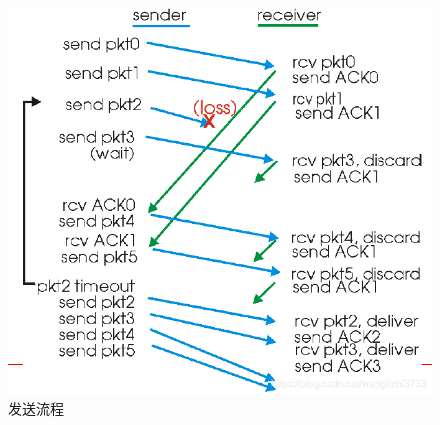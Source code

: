\documentclass[UTF8,a4paper,10pt]{ctexart}
\begin{document}
\begin{figure}[H]
    \centering
    \includegraphics[scale=0.6]{计网4.png}
    \caption{发送流程}
    \label{fig:4}
\end{figure}
\end{document}
